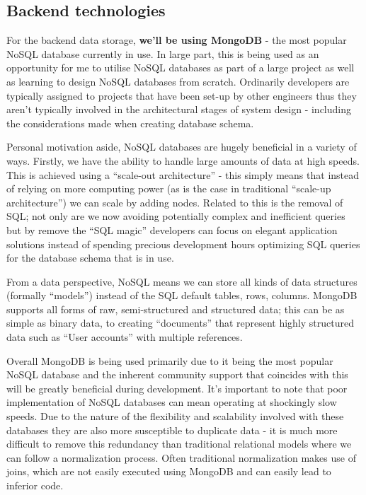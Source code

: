 \subsection{Backend technologies}
For the backend data storage, \textbf{we'll be using MongoDB}
- the most popular NoSQL database currently in use.
In large part, this is being used as an opportunity for me
to utilise NoSQL databases as part of a large project as well as
learning to design NoSQL databases from scratch. Ordinarily
developers are typically assigned to projects that have been set-up
by other engineers thus they aren't typically involved in the
architectural stages of system design - including the considerations made when creating database schema.
\par
Personal motivation aside, NoSQL databases are hugely beneficial in a variety of ways.
Firstly, we have the ability to handle large amounts of data at high speeds.
This is achieved using a ``scale-out architecture'' - this simply means that instead
of relying on more computing power (as is the case in traditional ``scale-up architecture'')
we can scale by adding nodes. Related to this is the removal of SQL; not only
are we now avoiding potentially complex and inefficient queries but by
remove the ``SQL magic'' developers can focus on elegant application solutions instead
of spending precious development hours optimizing SQL queries for the database schema that
is in use.
\par
From a data perspective, NoSQL means we can store all kinds of data
structures (formally ``models'') instead of the SQL default tables, rows, columns.
MongoDB supports all forms of raw, semi-structured and structured data; this can be as simple
as binary data, to creating ``documents'' that represent highly structured data such as ``User accounts''
with multiple references.
\par
Overall MongoDB is being used primarily due to it being the most popular NoSQL database and the inherent
community support that coincides with this will be greatly beneficial during development.
It's important to note that poor implementation of NoSQL databases
can mean operating at shockingly slow speeds. Due to the nature of the flexibility and scalability
involved with these databases they are also more susceptible to duplicate data - it is much more difficult
to remove this redundancy than traditional relational models where we can follow a normalization process.
Often traditional normalization makes use of joins, which are not easily executed using MongoDB
and can easily lead to inferior code.
\pagebreak

